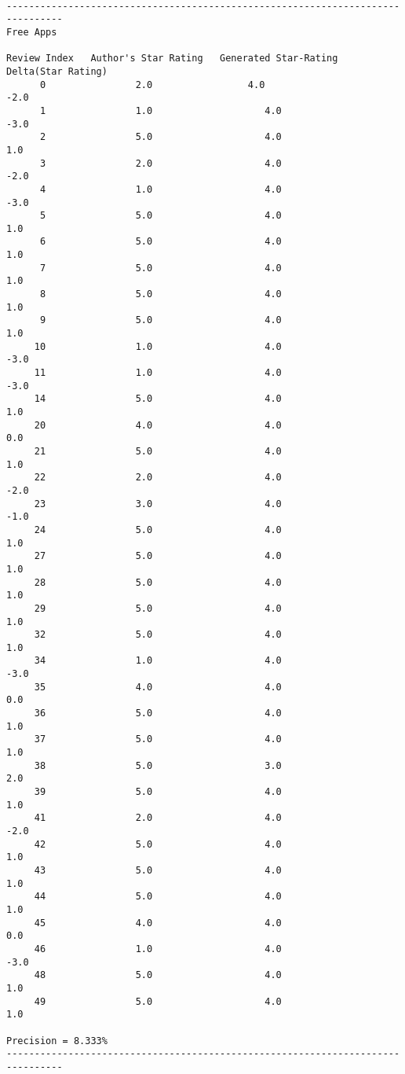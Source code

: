\documentclass[11pt]{report} %
\begin{document}
\begin{verbatim}

--------------------------------------------------------------------------------
Free Apps

Review Index   Author's Star Rating   Generated Star-Rating   Delta(Star Rating)
      0                2.0 	               4.0                      -2.0
      1                1.0                    4.0                   -3.0
      2                5.0                    4.0                    1.0
      3                2.0                    4.0                   -2.0
      4                1.0                    4.0                   -3.0
      5                5.0                    4.0                    1.0
      6                5.0                    4.0                    1.0
      7                5.0                    4.0                    1.0
      8                5.0                    4.0                    1.0
      9                5.0                    4.0                    1.0
     10                1.0                    4.0                   -3.0
     11                1.0                    4.0                   -3.0 
     14                5.0                    4.0                    1.0
     20                4.0                    4.0                    0.0
     21                5.0                    4.0                    1.0
     22                2.0                    4.0                   -2.0
     23                3.0                    4.0                   -1.0
     24                5.0                    4.0                    1.0
     27                5.0                    4.0                    1.0
     28                5.0                    4.0                    1.0
     29                5.0                    4.0                    1.0
     32                5.0                    4.0                    1.0
     34                1.0                    4.0                   -3.0
     35                4.0                    4.0                    0.0
     36                5.0                    4.0                    1.0
     37                5.0                    4.0                    1.0
     38                5.0                    3.0                    2.0
     39                5.0                    4.0                    1.0
     41                2.0                    4.0                   -2.0
     42                5.0                    4.0                    1.0
     43                5.0                    4.0                    1.0
     44                5.0                    4.0                    1.0
     45                4.0                    4.0                    0.0
     46                1.0                    4.0                   -3.0
     48                5.0                    4.0                    1.0
     49                5.0                    4.0                    1.0

Precision = 8.333%
--------------------------------------------------------------------------------

\end{verbatim}
\end{document}

